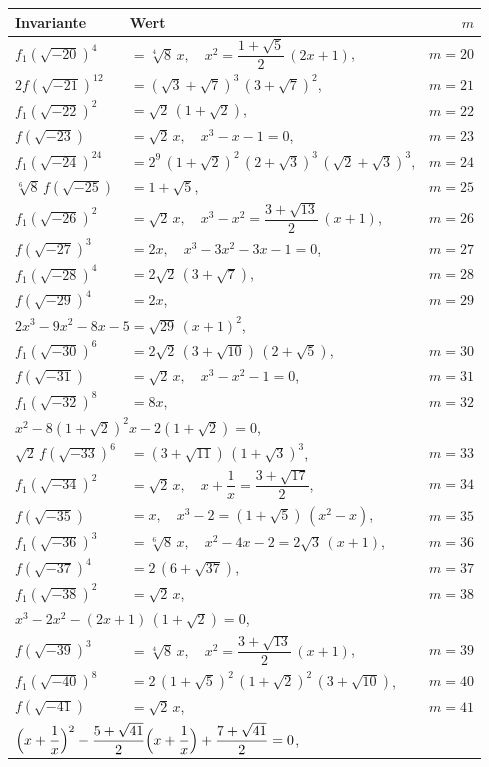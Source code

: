 \documentclass[12pt,a4paper]{article}
\begin{document}
\newpage
\setcounter{page}{722}

\begin{longtable}{@{}llr@{}}
\toprule
\multicolumn{1}{l}{\textbf{Invariante}} & \multicolumn{1}{l}{\textbf{Wert}} & $m$ \\
\midrule
\endhead
$f_1(\sqrt{-20})^4$ &$= \sqrt[4]{8}\,x,\quad x^2=\dfrac{1+\sqrt{5}}{2}\,(2x+1)$, & $m=20$ \\
$2f(\sqrt{-21})^{12}$ &$= (\sqrt{3}+\sqrt{7})^3\,(3+\sqrt{7})^2$, & $m=21$ \\
$f_1(\sqrt{-22})^2$ &$= \sqrt{2}\,(1+\sqrt{2})$, & $m=22$ \\
$f(\sqrt{-23})$ &$= \sqrt{2}\,x,\quad x^3-x-1=0$, & $m=23$ \\
$f_1(\sqrt{-24})^{24}$ &$= 2^9\,(1+\sqrt{2})^2\,(2+\sqrt{3})^3\,(\sqrt{2}+\sqrt{3})^3$, & $m=24$ \\
$\sqrt[6]{8}\,f(\sqrt{-25})$ &$= 1+\sqrt{5}$, & $m=25$ \\
$f_1(\sqrt{-26})^2$ &$= \sqrt{2}\,x,\quad x^3-x^2=\dfrac{3+\sqrt{13}}{2}\,(x+1)$, & $m=26$ \\
$f(\sqrt{-27})^3$ &$= 2x,\quad x^3-3x^2-3x-1=0$, & $m=27$ \\
$f_1(\sqrt{-28})^4$ &$= 2\sqrt{2}\,(3+\sqrt{7})$, & $m=28$ \\
$f(\sqrt{-29})^4$ &$= 2x$, & $m=29$ \\
\multicolumn{3}{l}{\qquad$2x^3-9x^2-8x-5=\sqrt{29}\,(x+1)^2$,} \\
$f_1(\sqrt{-30})^6$ &$= 2\sqrt{2}\,(3+\sqrt{10})\,(2+\sqrt{5})$, & $m=30$ \\
$f(\sqrt{-31})$ &$= \sqrt{2}\,x,\quad x^3-x^2-1=0$, & $m=31$ \\
$f_1(\sqrt{-32})^8$ &$= 8x$, & $m=32$ \\
\multicolumn{3}{l}{\qquad$x^2-8(1+\sqrt{2})^2x-2(1+\sqrt{2})=0$,} \\
$\sqrt{2}\,f(\sqrt{-33})^6$ &$= (3+\sqrt{11})\,(1+\sqrt{3})^3$, & $m=33$ \\
$f_1(\sqrt{-34})^2$ &$= \sqrt{2}\,x,\quad x+\dfrac{1}{x}=\dfrac{3+\sqrt{17}}{2}$, & $m=34$ \\
$f(\sqrt{-35})$ &$= x,\quad x^3-2=(1+\sqrt{5})\,(x^2-x)$, & $m=35$ \\
$f_1(\sqrt{-36})^3$ &$= \sqrt[6]{8}\,x,\quad x^2-4x-2=2\sqrt{3}\,(x+1)$, & $m=36$ \\
$f(\sqrt{-37})^4$ &$= 2\,(6+\sqrt{37})$, & $m=37$ \\
$f_1(\sqrt{-38})^2$ &$= \sqrt{2}\,x$, & $m=38$ \\
\multicolumn{3}{l}{\qquad$x^3-2x^2-(2x+1)\,(1+\sqrt{2})=0$,} \\
$f(\sqrt{-39})^3$ &$= \sqrt[4]{8}\,x,\quad x^2=\dfrac{3+\sqrt{13}}{2}\,(x+1)$, & $m=39$ \\
$f_1(\sqrt{-40})^8$ &$= 2\,(1+\sqrt{5})^2\,(1+\sqrt{2})^2\,(3+\sqrt{10})$, & $m=40$ \\
$f(\sqrt{-41})$ &$= \sqrt{2}\,x$, & $m=41$ \\
\multicolumn{3}{l}{\qquad$\Bigl(x+\dfrac{1}{x}\Bigr)^2-\dfrac{5+\sqrt{41}}{2}\Bigl(x+\dfrac{1}{x}\Bigr)+\dfrac{7+\sqrt{41}}{2}=0$,} \\
\bottomrule
\end{longtable}
\end{document}
